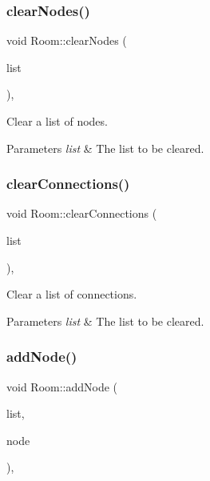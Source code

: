 \subsubsection{\texorpdfstring{clear\+Nodes()}{clearNodes()}}
{\footnotesize\ttfamily void Room\+::clear\+Nodes (\begin{DoxyParamCaption}\item[{Q\+Qml\+List\+Property$<$ \mbox{\hyperlink{classNode}{Node}} $>$ $\ast$}]{list }\end{DoxyParamCaption})\hspace{0.3cm}{\ttfamily [static]}, {\ttfamily [private]}}



Clear a list of nodes. 


\begin{DoxyParams}{Parameters}
{\em list} & The list to be cleared. \\
\hline
\end{DoxyParams}
\mbox{\label{classRoom_a62765f1f397f932e6d2aa7ed00e0deff}} 
\subsubsection{\texorpdfstring{clear\+Connections()}{clearConnections()}}
{\footnotesize\ttfamily void Room\+::clear\+Connections (\begin{DoxyParamCaption}\item[{Q\+Qml\+List\+Property$<$ \mbox{\hyperlink{classConnection}{Connection}} $>$ $\ast$}]{list }\end{DoxyParamCaption})\hspace{0.3cm}{\ttfamily [static]}, {\ttfamily [private]}}



Clear a list of connections. 


\begin{DoxyParams}{Parameters}
{\em list} & The list to be cleared. \\
\hline
\end{DoxyParams}
\mbox{\label{classRoom_a98d12ac4c68d68775b1e429bc3ad31cf}} 
\subsubsection{\texorpdfstring{add\+Node()}{addNode()}}
{\footnotesize\ttfamily void Room\+::add\+Node (\begin{DoxyParamCaption}\item[{Q\+Qml\+List\+Property$<$ \mbox{\hyperlink{classNode}{Node}} $>$ $\ast$}]{list,  }\item[{\mbox{\hyperlink{classNode}{Node}} $\ast$}]{node }\end{DoxyParamCaption})\hspace{0.3cm}{\ttfamily [static]}, {\ttfamily [private]}}



